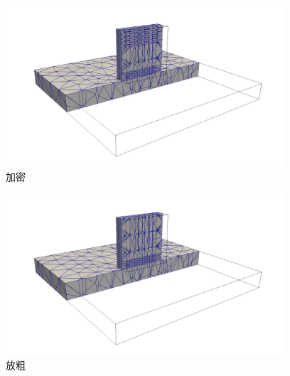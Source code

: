 \begin{figure}[!htbp]
  \centering
  \includegraphics[height=6cm]{fig/2/26.png}
  \caption{加密}
  \label{fig:2-1}
\end{figure}

\begin{figure}[!htbp]
  \centering
  \includegraphics[height=6cm]{fig/2/27.png}
  \caption{放粗}
  \label{fig:2-1}
\end{figure}
